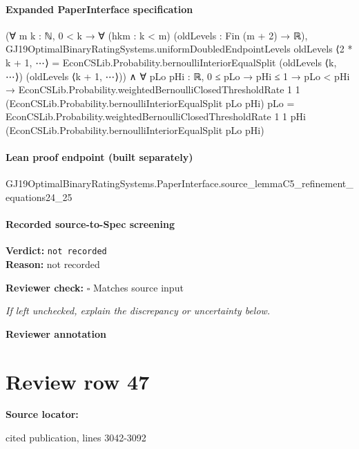 \documentclass[10pt]{article}
\newcommand{\reviewerbox}{%
  \par\noindent\fbox{\parbox{0.96\linewidth}{\rule{0pt}{0.38in}}}\par
}
\newcommand{\reviewmatch}[1]{%
  \par\noindent\textbf{Reviewer check:} $\square$\; #1\par
  \noindent\emph{If left unchecked, explain the discrepancy or uncertainty below.}\par
}
\begin{document}
\paragraph{Expanded PaperInterface specification}
\begin{ReviewVerbatim}
(∀ {m k : ℕ},
    0 < k →
      ∀ (hkm : k < m) (oldLevels : Fin (m + 2) → ℝ),
        GJ19OptimalBinaryRatingSystems.uniformDoubledEndpointLevels oldLevels ⟨2 * k + 1, ⋯⟩ =
          EconCSLib.Probability.bernoulliInteriorEqualSplit (oldLevels ⟨k, ⋯⟩) (oldLevels ⟨k + 1, ⋯⟩)) ∧
  ∀ {pLo pHi : ℝ},
    0 ≤ pLo →
      pHi ≤ 1 →
        pLo < pHi →
          EconCSLib.Probability.weightedBernoulliClosedThresholdRate 1 1
              (EconCSLib.Probability.bernoulliInteriorEqualSplit pLo pHi) pLo =
            EconCSLib.Probability.weightedBernoulliClosedThresholdRate 1 1 pHi
              (EconCSLib.Probability.bernoulliInteriorEqualSplit pLo pHi)
\end{ReviewVerbatim}

\paragraph{Lean proof endpoint (built separately)}\begin{ReviewVerbatim}
GJ19OptimalBinaryRatingSystems.PaperInterface.source_lemmaC5_refinement_equations24_25
\end{ReviewVerbatim}

\paragraph{Recorded source-to-Spec screening}
\textbf{Verdict:} \texttt{not recorded}
\\
\textbf{Reason:} not recorded
\reviewmatch{Matches source input}
\noindent\textbf{Reviewer annotation}\par
\reviewerbox
\clearpage
\hypertarget{source-claim-4cea7b91f971b40f}{}
\section*{Review row 47}
\textbf{Source locator:} {\footnotesize\raggedright cited publication, lines 3042-\allowbreak{}3092\par}
\end{document}
